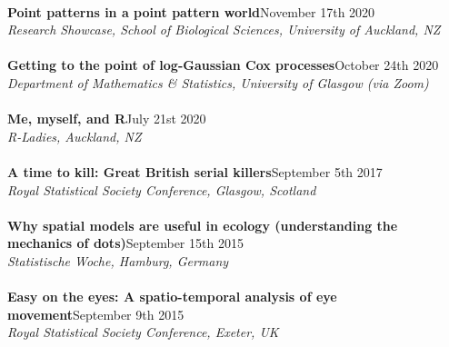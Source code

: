 \documentclass[10pt,letter]{article}
\begin{document}
       \hdashrule[0.5ex]{4cm}{1pt}{1pt}\\
                 {\textbf{Point patterns in a point pattern world}}\hfill November 17th 2020\\
                 {\sl Research Showcase, School of Biological Sciences, University of Auckland, NZ}\\
                 \hdashrule[0.5ex]{4cm}{1pt}{1pt}\\
                           {\textbf{Getting to the point of log-Gaussian Cox processes}}\hfill October 24th 2020\\
                           {\sl Department of Mathematics \& Statistics, University of Glasgow (via Zoom)}\\
                           \hdashrule[0.5ex]{4cm}{1pt}{1pt}\\
                                     {\textbf{Me, myself, and R}}\hfill July 21st 2020\\
                                     {\sl R-Ladies, Auckland, NZ}\\
                                     \hdashrule[0.5ex]{4cm}{1pt}{1pt}\\
                                     \textbf{A time to kill: Great British serial killers}\hfill  September 5th 2017\\
                                            {\sl Royal Statistical Society Conference, Glasgow, Scotland}\\
                                            \hdashrule[0.5ex]{4cm}{1pt}{1pt}\\
                                            \textbf{Why spatial models are useful in ecology (understanding the \\
                                              mechanics of dots)}\hfill September 15th 2015\\
                                                   {\sl Statistische Woche, Hamburg, Germany}\\
                                                   \hdashrule[0.5ex]{4cm}{1pt}{1pt}\\
                                                   \textbf{Easy on the eyes: A spatio-temporal analysis of eye movement}\hfill September 9th 2015\\
                                                          {\sl Royal Statistical Society Conference, Exeter, UK}\\
                                                          \hdashrule[0.5ex]{4cm}{1pt}{1pt}\\
\end{document}
